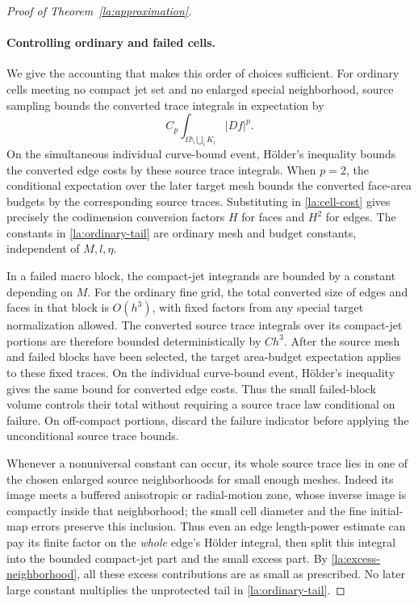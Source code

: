 \begin{proof}[Proof of Theorem~\ref{la:approximation}]
\paragraph{Controlling ordinary and failed cells.}
We give the accounting that makes this order of choices sufficient.
For ordinary cells meeting no compact jet set and no enlarged special
neighborhood, source sampling bounds the converted trace integrals in
expectation by
\begin{equation}\label{la:ordinary-tail}
 C_p\int_{\Omega\setminus\bigcup_iK_i}|Df|^p.
\end{equation}
On the simultaneous individual curve-bound event, H\"older's inequality
bounds the converted edge costs by these source trace integrals.  When
$p=2$, the conditional expectation over the later target mesh bounds
the converted face-area budgets by the corresponding source traces.
Substituting in \eqref{la:cell-cost} gives precisely the codimension
conversion factors $H$ for faces and $H^2$ for edges.  The constants in
\eqref{la:ordinary-tail} are ordinary mesh and budget constants,
independent of $M,l,\eta$.

In a failed macro block, the compact-jet integrands are bounded by a
constant depending on $M$.  For the ordinary fine grid, the total
converted size of edges and faces in that block is $O(h^3)$, with
fixed factors from any special target normalization allowed.
The converted source trace integrals over its compact-jet portions
are therefore bounded deterministically by $C h^3$.  After the source
mesh and failed blocks have been selected, the target area-budget
expectation applies to these fixed traces.  On the individual
curve-bound event, H\"older's inequality gives the same bound for
converted edge costs.  Thus the small failed-block volume controls
their total without requiring a source trace law conditional on
failure.  On off-compact portions, discard the failure indicator
before applying the unconditional source trace bounds.

Whenever a nonuniversal constant can occur, its whole source trace
lies in one of the chosen enlarged source neighborhoods for small
enough meshes.  Indeed its image meets a buffered anisotropic or
radial-motion zone, whose inverse image is compactly inside that
neighborhood; the small cell diameter and the fine initial-map
errors preserve this inclusion.  Thus even an edge length-power
estimate can pay its finite factor on the \emph{whole} edge's
H\"older integral, then split this integral into the bounded
compact-jet part and the small excess part.  By
\eqref{la:excess-neighborhood}, all these excess contributions are
as small as prescribed.  No later large constant multiplies the
unprotected tail in \eqref{la:ordinary-tail}.


\end{proof}
